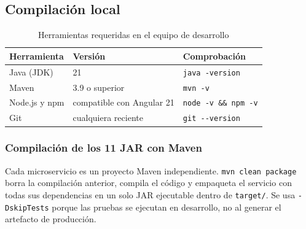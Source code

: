 \subsection{Compilación local}\label{sec:4_2_compilacion_local}
\begin{table}[H]
\centering
\caption{Herramientas requeridas en el equipo de desarrollo}
\small
\begin{tabular}{lll}
\toprule
\textbf{Herramienta} & \textbf{Versión} & \textbf{Comprobación} \\
\midrule
Java (JDK) & 21 & \texttt{java -version} \\
Maven & 3.9 o superior & \texttt{mvn -v} \\
Node.js y npm & compatible con Angular 21 & \texttt{node -v \&\& npm -v} \\
Git & cualquiera reciente & \texttt{git -{}-version} \\
\bottomrule
\end{tabular}
\end{table}

\subsubsection{Compilación de los 11 JAR con Maven}
Cada microservicio es un proyecto Maven independiente. \texttt{mvn clean package} borra la compilación anterior, compila el código y empaqueta el servicio con todas sus dependencias en un solo JAR ejecutable dentro de \texttt{target/}. Se usa \texttt{-DskipTests} porque las pruebas se ejecutan en desarrollo, no al generar el artefacto de producción.

